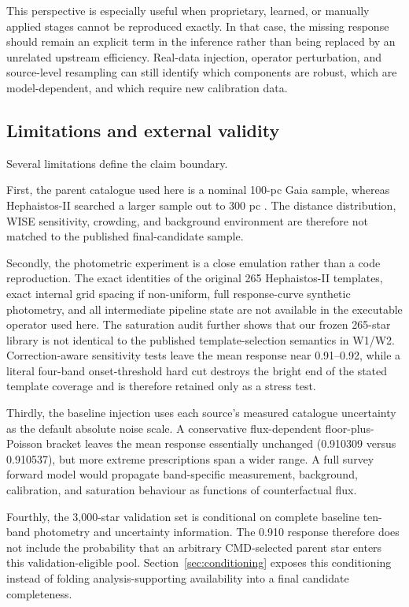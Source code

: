 \documentclass[fleqn,usenatbib]{mnras}
\begin{document}
This perspective is especially useful when proprietary, learned, or manually applied stages cannot be reproduced exactly. In that case, the missing response should remain an explicit term in the inference rather than being replaced by an unrelated upstream efficiency. Real-data injection, operator perturbation, and source-level resampling can still identify which components are robust, which are model-dependent, and which require new calibration data.

\subsection{Limitations and external validity}
\label{sec:limitations}

Several limitations define the claim boundary.

First, the parent catalogue used here is a nominal 100-pc Gaia sample, whereas Hephaistos-II searched a larger sample out to 300 pc \citep{Suazo2024}. The distance distribution, WISE sensitivity, crowding, and background environment are therefore not matched to the published final-candidate sample.

Secondly, the photometric experiment is a close emulation rather than a code reproduction. The exact identities of the original 265 Hephaistos-II templates, exact internal grid spacing if non-uniform, full response-curve synthetic photometry, and all intermediate pipeline state are not available in the executable operator used here. The saturation audit further shows that our frozen 265-star library is not identical to the published template-selection semantics in W1/W2. Correction-aware sensitivity tests leave the mean response near 0.91--0.92, while a literal four-band onset-threshold hard cut destroys the bright end of the stated template coverage and is therefore retained only as a stress test.

Thirdly, the baseline injection uses each source's measured catalogue uncertainty as the default absolute noise scale. A conservative flux-dependent floor-plus-Poisson bracket leaves the mean response essentially unchanged (0.910309 versus 0.910537), but more extreme prescriptions span a wider range. A full survey forward model would propagate band-specific measurement, background, calibration, and saturation behaviour as functions of counterfactual flux.

Fourthly, the 3,000-star validation set is conditional on complete baseline ten-band photometry and uncertainty information. The 0.910 response therefore does not include the probability that an arbitrary CMD-selected parent star enters this validation-eligible pool. Section~\ref{sec:conditioning} exposes this conditioning instead of folding analysis-supporting availability into a final candidate completeness.
\end{document}
